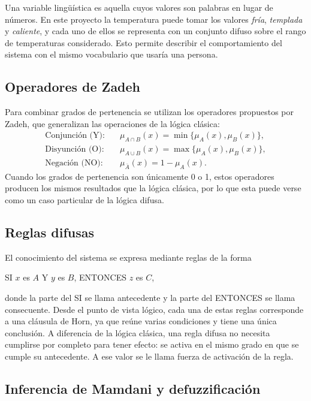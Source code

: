 \documentclass[11pt]{article}
\begin{document}
Una variable lingüística es aquella cuyos valores son palabras en lugar de números. En este proyecto la temperatura puede tomar los valores \emph{fría}, \emph{templada} y \emph{caliente}, y cada uno de ellos se representa con un conjunto difuso sobre el rango de temperaturas considerado. Esto permite describir el comportamiento del sistema con el mismo vocabulario que usaría una persona.

\subsection{Operadores de Zadeh}

Para combinar grados de pertenencia se utilizan los operadores propuestos por Zadeh, que generalizan las operaciones de la lógica clásica:
\begin{align*}
\text{Conjunción (Y):} \quad & \mu_{A \cap B}(x) = \min\{\mu_A(x), \mu_B(x)\}, \\
\text{Disyunción (O):} \quad & \mu_{A \cup B}(x) = \max\{\mu_A(x), \mu_B(x)\}, \\
\text{Negación (NO):} \quad & \mu_{\bar{A}}(x) = 1 - \mu_A(x).
\end{align*}
Cuando los grados de pertenencia son únicamente 0 o 1, estos operadores producen los mismos resultados que la lógica clásica, por lo que esta puede verse como un caso particular de la lógica difusa.

\subsection{Reglas difusas}

El conocimiento del sistema se expresa mediante reglas de la forma
\begin{center}
SI $x$ es $A$ Y $y$ es $B$, ENTONCES $z$ es $C$,
\end{center}
donde la parte del SI se llama antecedente y la parte del ENTONCES se llama consecuente. Desde el punto de vista lógico, cada una de estas reglas corresponde a una cláusula de Horn, ya que reúne varias condiciones y tiene una única conclusión. A diferencia de la lógica clásica, una regla difusa no necesita cumplirse por completo para tener efecto: se activa en el mismo grado en que se cumple su antecedente. A ese valor se le llama fuerza de activación de la regla.

\subsection{Inferencia de Mamdani y defuzzificación}
\end{document}
